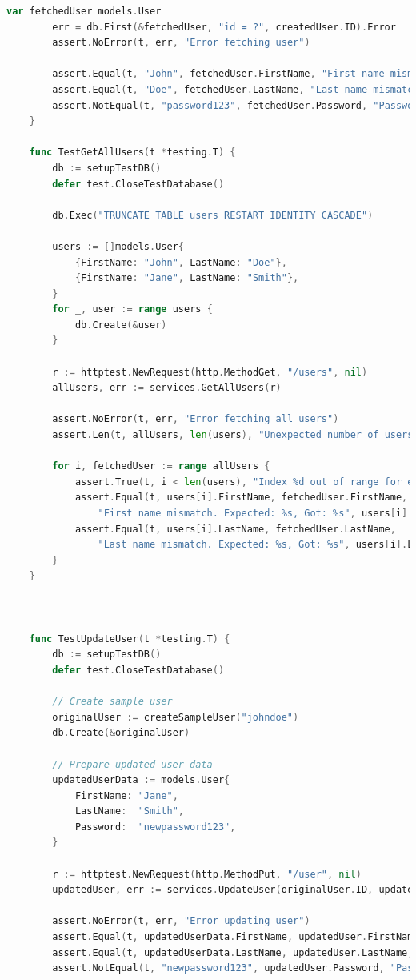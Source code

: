 \begin{lstlisting}[language=Go, frame=single]
		var fetchedUser models.User
		err = db.First(&fetchedUser, "id = ?", createdUser.ID).Error
		assert.NoError(t, err, "Error fetching user")
	
		assert.Equal(t, "John", fetchedUser.FirstName, "First name mismatch")
		assert.Equal(t, "Doe", fetchedUser.LastName, "Last name mismatch")
		assert.NotEqual(t, "password123", fetchedUser.Password, "Password should be hashed")
	}
	
	func TestGetAllUsers(t *testing.T) {
		db := setupTestDB()
		defer test.CloseTestDatabase()
	
		db.Exec("TRUNCATE TABLE users RESTART IDENTITY CASCADE")
	
		users := []models.User{
			{FirstName: "John", LastName: "Doe"},
			{FirstName: "Jane", LastName: "Smith"},
		}
		for _, user := range users {
			db.Create(&user)
		}
	
		r := httptest.NewRequest(http.MethodGet, "/users", nil)
		allUsers, err := services.GetAllUsers(r)
	
		assert.NoError(t, err, "Error fetching all users")
		assert.Len(t, allUsers, len(users), "Unexpected number of users fetched")
	
		for i, fetchedUser := range allUsers {
			assert.True(t, i < len(users), "Index %d out of range for expected users", i)
			assert.Equal(t, users[i].FirstName, fetchedUser.FirstName, 
				"First name mismatch. Expected: %s, Got: %s", users[i].FirstName, fetchedUser.FirstName)
			assert.Equal(t, users[i].LastName, fetchedUser.LastName, 
				"Last name mismatch. Expected: %s, Got: %s", users[i].LastName, fetchedUser.LastName)
		}
	}
	
	
	
	func TestUpdateUser(t *testing.T) {
		db := setupTestDB()
		defer test.CloseTestDatabase()
	
		// Create sample user
		originalUser := createSampleUser("johndoe")
		db.Create(&originalUser)
	
		// Prepare updated user data
		updatedUserData := models.User{
			FirstName: "Jane",
			LastName:  "Smith",
			Password:  "newpassword123",
		}
	
		r := httptest.NewRequest(http.MethodPut, "/user", nil)
		updatedUser, err := services.UpdateUser(originalUser.ID, updatedUserData, r)
	
		assert.NoError(t, err, "Error updating user")
		assert.Equal(t, updatedUserData.FirstName, updatedUser.FirstName, "First name mismatch")
		assert.Equal(t, updatedUserData.LastName, updatedUser.LastName, "Last name mismatch")
		assert.NotEqual(t, "newpassword123", updatedUser.Password, "Password should be hashed")
	

\end{lstlisting}
